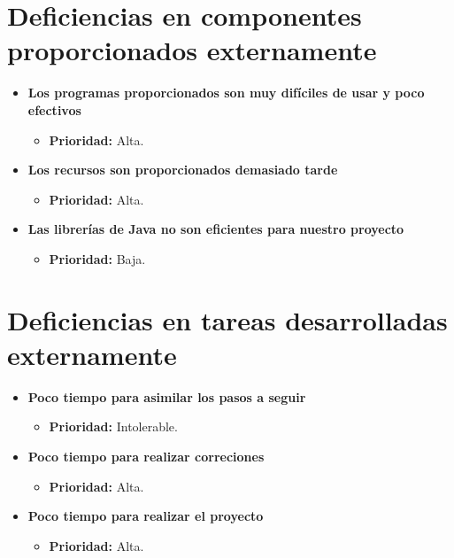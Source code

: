 \documentclass[spanish,a4paper,11pt, twoside]{report}	%
\begin{document}
\section{Deficiencias en componentes proporcionados externamente}
	\begin{itemize}
		
		\item \textbf{Los programas proporcionados son muy difíciles de usar y poco efectivos}	
			\begin{itemize}
				\item \textbf{Prioridad: }Alta.
			\end{itemize}
		
		\item \textbf{Los recursos son proporcionados demasiado tarde}	%
			\begin{itemize}
				\item \textbf{Prioridad: }Alta.
			\end{itemize}

		\item \textbf{Las librerías de Java no son eficientes para nuestro proyecto}	
			\begin{itemize}
				\item \textbf{Prioridad: }Baja.
			\end{itemize}
	\end{itemize}
%
\section{Deficiencias en tareas desarrolladas externamente}
	\begin{itemize}
		\item \textbf{Poco tiempo para asimilar los pasos a seguir}	
			\begin{itemize}
				\item \textbf{Prioridad: }Intolerable.
			\end{itemize}

		\item \textbf{Poco tiempo para realizar correciones}	%
			\begin{itemize}
				\item \textbf{Prioridad: }Alta.
			\end{itemize}

\item \textbf{Poco tiempo para realizar el proyecto}
			\begin{itemize}
				\item \textbf{Prioridad: }Alta.
			\end{itemize}
		
	\end{itemize}
%
\end{document}
